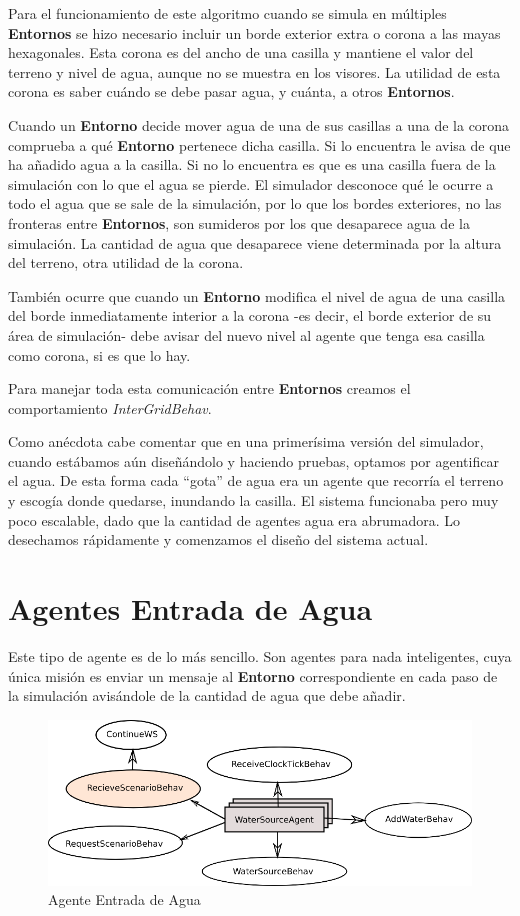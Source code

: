 Para el funcionamiento de este algoritmo cuando se simula en múltiples {\bf
Entornos} se hizo necesario incluir un borde exterior extra o corona a las mayas
hexagonales. Esta corona es del ancho de una casilla y mantiene el valor del
terreno y nivel de agua, aunque no se muestra en los visores. La utilidad de
esta corona es saber cuándo se debe pasar agua, y cuánta, a otros {\bf
Entornos}.

Cuando un {\bf Entorno} decide mover agua de una de sus casillas a una de la
corona comprueba a qué {\bf Entorno} pertenece dicha casilla. Si lo encuentra
le avisa de que ha añadido agua a la casilla. Si no lo encuentra es que es una
casilla fuera de la simulación con lo que el agua se pierde. El simulador
desconoce qué le ocurre a todo el agua que se sale de la simulación, por lo que
los bordes exteriores, no las fronteras entre {\bf Entornos}, son sumideros por
los que desaparece agua de la simulación. La cantidad de agua que desaparece
viene determinada por la altura del terreno, otra utilidad de la corona.

También ocurre que cuando un {\bf Entorno} modifica el nivel de agua de una
casilla del borde inmediatamente interior a la corona -es decir, el borde
exterior de su área de simulación- debe avisar del nuevo nivel al agente que
tenga esa casilla como corona, si es que lo hay.

Para manejar toda esta comunicación entre {\bf Entornos} creamos el
comportamiento {\em InterGridBehav}.

Como anécdota cabe comentar que en una primerísima versión del simulador,
cuando estábamos aún diseñándolo y haciendo pruebas, optamos por agentificar el
agua. De esta forma cada ``gota'' de agua era un agente que recorría el terreno
y escogía donde quedarse, inundando la casilla. El sistema funcionaba pero muy
poco escalable, dado que la cantidad de agentes agua era abrumadora. Lo
desechamos rápidamente y comenzamos el diseño del sistema actual.

\section*{Agentes Entrada de Agua}

Este tipo de agente es de lo más sencillo. Son agentes para nada inteligentes,
cuya única misión es enviar un mensaje al {\bf Entorno} correspondiente en cada
paso de la simulación avisándole de la cantidad de agua que debe añadir.

\begin{figure}[H]
 \centering
 \includegraphics[width=120mm]{figuras/cap5/ag_water_source.png}
 \caption{Agente Entrada de Agua}
\end{figure}

